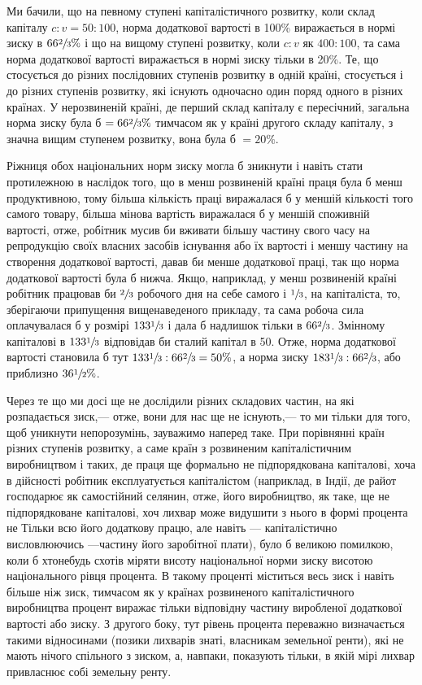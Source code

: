 \documentclass[12pt, a4paper, final]{memoir}
\begin{document}
Ми бачили, що на певному ступені капіталістичного розвитку, коли склад капіталу $c:v = 50:100$, норма додаткової вартості в 100\% виражається в нормі зиску в $66\sfrac{2}{3}\%$ і що на вищому ступені розвитку, коли $c:v$ як $400:100$, та сама норма додаткової вартості виражається в нормі зиску тільки в 20\%. Те, що стосується до різних послідовних ступенів розвитку в одній країні, стосується і до різних ступенів розвитку, які існують одночасно один поряд одного в різних країнах. У нерозвиненій країні, де перший склад капіталу є пересічний, загальна норма зиску була б $=66\sfrac{2}{3}\%$ тимчасом як у країні другого складу капіталу, з значна вищим ступенем розвитку, вона була б $=20\%$.

Ріжниця обох національних норм зиску могла б зникнути і навіть стати протилежною в наслідок того, що в менш розвиненій країні праця була б менш продуктивною, тому більша кількість праці виражалася б у меншій кількості того самого товару, більша мінова вартість виражалася б у меншій споживній вартості, отже, робітник мусив би вживати більшу частину свого часу на репродукцію своїх власних засобів існування або їх вартості і меншу частину на створення додаткової вартості, давав би менше додаткової праці, так що норма додаткової вартості була б нижча. Якщо, наприклад, у менш розвиненій країні робітник працював би $\sfrac{2}{3}$ робочого дня на себе самого і $\sfrac{1}{3}$, на капіталіста, то, зберігаючи припущення вищенаведеного прикладу, та сама робоча сила оплачувалася б у розмірі $133\sfrac{1}{3}$ і дала б надлишок тільки в $66\sfrac{2}{3}$. Змінному капіталові в $133\sfrac{1}{3}$ відповідав би сталий капітал в 50. Отже, норма додаткової вартості становила б тут $133\sfrac{1}{3}:66\sfrac{2}{3}=50\%$, а норма зиску $183\sfrac{1}{3}:66\sfrac{2}{3}$, або приблизно $36\sfrac{1}{2}\%$.

Через те що ми досі ще не дослідили різних складових частин, на які розпадається зиск,— отже, вони для нас ще не існують,— то ми тільки для того, щоб уникнути непорозумінь, зауважимо наперед таке. При порівнянні країн різних ступенів розвитку, а саме країн з розвиненим капіталістичним виробництвом і таких, де праця ще формально не підпорядкована капіталові, хоча в дійсності робітник експлуатується капіталістом (наприклад, в Індії, де райот господарює як самостійний селянин, отже, його виробництво, як таке, ще не підпорядковане капіталові, хоч лихвар може видушити з нього в формі процента не Тільки всю його додаткову працю, але навіть — капіталістично висловлюючись —частину його заробітної плати), було б великою помилкою, коли б хтонебудь схотів міряти висоту національної норми зиску висотою національного рівця процента. В такому проценті міститься весь зиск і навіть більше ніж зиск, тимчасом як у країнах розвиненого капіталістичного виробництва процент виражає тільки відповідну частину виробленої додаткової вартості або зиску. З другого боку, тут рівень процента переважно визначається такими відносинами (позики лихварів знаті, власникам земельної ренти), які не мають нічого спільного з зиском, а, навпаки, показують тільки, в якій мірі лихвар привласнює собі земельну ренту.
\end{document}
